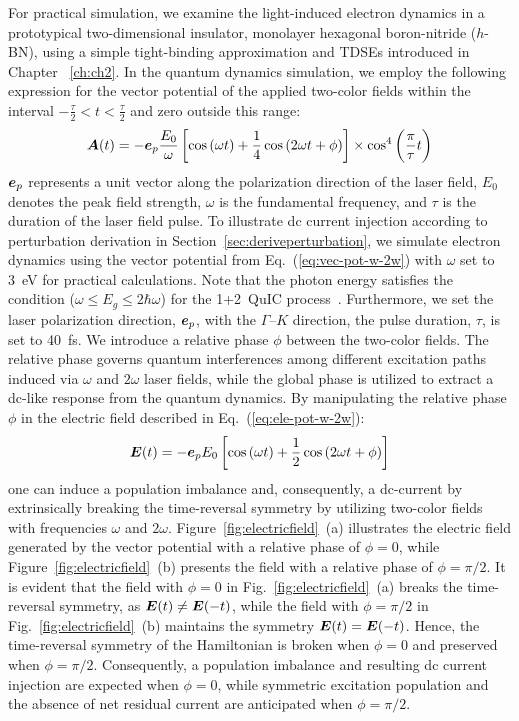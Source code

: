  For practical simulation, we examine the light-induced electron dynamics in a prototypical two-dimensional insulator, monolayer hexagonal boron-nitride ($h$-BN), using a simple tight-binding approximation and \glspl{TDSE} introduced in Chapter ~\ref{ch:ch2}. In the quantum dynamics simulation, we employ the following expression for the vector potential of the applied two-color fields within the interval $-\frac{\tau}{2} < t < \frac{\tau}{2}$ and zero outside this range:
\begin{equation}
\boldsymbol{A}(t) = -\boldsymbol{e}_p \frac{E_0}{\omega} \left [
\cos \left (\omega t \right ) + \frac{1}{4}\cos
\left (2\omega t + \phi \right )
\right ] \nonumber \times \cos^4 \left (\frac{\pi}{\tau}t \right )
\end{equation}
$\boldsymbol{e}_p$ represents a unit vector along the polarization direction of the laser field, $E_0$ denotes the peak field strength, $\omega$ is the fundamental frequency, and $\tau$ is the duration of the laser field pulse. 
To illustrate dc current injection according to perturbation derivation in Section~\ref{sec:deriveperturbation}, we simulate electron dynamics using the vector potential from Eq.~(\ref{eq:vec-pot-w-2w}) with $\omega$ set to 3~eV for practical calculations. Note that the photon energy satisfies the condition ($\omega \le E_g \le 2\hbar \omega$) for the 1+2~\gls{QuIC} process~\cite{PhysRevLett.76.1703}. Furthermore,  we set the laser polarization direction, $\boldsymbol e_{p}$, with the $\Gamma$--$K$ direction, the pulse duration, $\tau$, is set to 40~fs.
We introduce a relative phase $\phi$ between the two-color fields. The relative phase governs quantum interferences among different excitation paths induced via $\omega$ and $2\omega$ laser fields, while the global phase is utilized to extract a dc-like response from the quantum dynamics.
By manipulating the relative phase $\phi$ in the electric field described in Eq.~(\ref{eq:ele-pot-w-2w}):
\begin{equation}
\boldsymbol{E}(t) =-\boldsymbol{e}_p {E_0} \left [
\cos \left (\omega t \right ) + \frac{1}{2}\cos
\left (2\omega t + \phi \right )
\right ] \nonumber
\label{eq:ele-pot-w-2w}
\end{equation}
one can induce a population imbalance and, consequently, a dc-current by extrinsically breaking the time-reversal symmetry by utilizing two-color fields with frequencies $\omega$ and $2\omega$. Figure~\ref{fig:electricfield}~(a) illustrates the electric field generated by the vector potential with a relative phase of $\phi=0$, while Figure~\ref{fig:electricfield}~(b) presents the field with a relative phase of $\phi=\pi/2$. It is evident that the field with $\phi=0$ in Fig.~\ref{fig:electricfield}~(a) breaks the time-reversal symmetry, as $\boldsymbol{E}(t) \neq \boldsymbol{E}(-t)$, while the field with $\phi=\pi/2$ in Fig.~\ref{fig:electricfield}~(b) maintains the symmetry $\boldsymbol{E}(t)=\boldsymbol{E}(-t)$. Hence, the time-reversal symmetry of the Hamiltonian is broken when $\phi=0$ and preserved when $\phi=\pi/2$. Consequently, a population imbalance and resulting dc current injection are expected when $\phi=0$, while symmetric excitation population and the absence of net residual current are anticipated when $\phi=\pi/2$.
